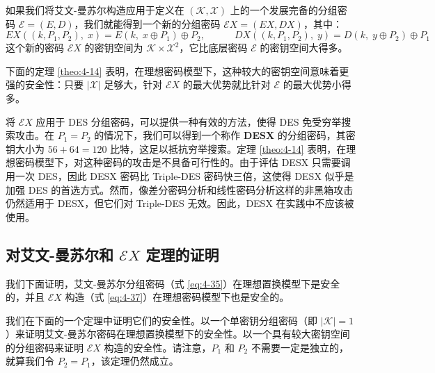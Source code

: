 \begin{snote}
如果我们将艾文-曼苏尔构造应用于定义在 $(\mathcal{K},\mathcal{X})$ 上的一个发展完备的分组密码 $\mathcal{E}=(E,D)$，我们就能得到一个新的分组密码 $\mathcal{E}X=(EX,DX)$，其中：
\begin{equation}\label{eq:4-37}
EX((k,P_1,P_2),\;x)=E(k,\;x\oplus P_1)\oplus P_2,
\quad\quad\quad
DX((k,P_1,P_2),\;y)=D(k,\;y\oplus P_2)\oplus P_1
\end{equation}
这个新的密码 $\mathcal{E}X$ 的密钥空间为 $\mathcal{K}\times\mathcal{X}^2$，它比底层密码 $\mathcal{E}$ 的密钥空间大得多。

下面的定理 \ref{theo:4-14} 表明，在理想密码模型下，这种较大的密钥空间意味着更强的安全性：只要 $|\mathcal{X}|$ 足够大，针对 $\mathcal{E}X$ 的最大优势就比针对 $\mathcal{E}$ 的最大优势小得多。

将 $\mathcal{E}X$ 应用于 DES 分组密码，可以提供一种有效的方法，使得 DES 免受穷举搜索攻击。在 $P_1=P_2$ 的情况下，我们可以得到一个称作 \textbf{DESX} 的分组密码，其密钥大小为 $56+64=120$ 比特，这足以抵抗穷举搜索。定理 \ref{theo:4-14} 表明，在理想密码模型下，对这种密码的攻击是不具备可行性的。由于评估 DESX 只需要调用一次 DES，因此 DESX 密码比 Triple-DES 密码快三倍，这使得 DESX 似乎是加强 DES 的首选方式。然而，像差分密码分析和线性密码分析这样的非黑箱攻击仍然适用于 DESX，但它们对 Triple-DES 无效。因此，DESX 在实践中不应该被使用。
\end{snote}

\subsection{对艾文-曼苏尔和 $\mathcal{E}X$ 定理的证明}

我们下面证明，艾文-曼苏尔分组密码（式 \ref{eq:4-35}）在理想置换模型下是安全的，并且 $\mathcal{E}X$ 构造（式 \ref{eq:4-37}）在理想密码模型下也是安全的。

我们在下面的一个定理中证明它们的安全性。以一个单密钥分组密码（即 $|\mathcal{K}|=1$）来证明艾文-曼苏尔密码在理想置换模型下的安全性。以一个具有较大密钥空间的分组密码来证明 $\mathcal{E}X$ 构造的安全性。请注意，$P_1$ 和 $P_2$ 不需要一定是独立的，就算我们令 $P_2=P_1$，该定理仍然成立。

